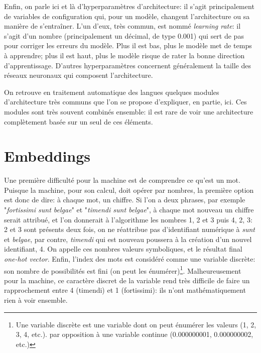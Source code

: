 Enfin, on parle ici et là d'hyperparamètres d'architecture: il s'agit principalement de variables de configuration qui, pour un modèle, changent l'architecture ou sa manière de s'entraîner. L'un d'eux, très commun, est nommé \textit{learning rate}: il s'agit d'un nombre (principalement un décimal, de type 0.001) qui sert de pas pour corriger les erreurs du modèle. Plus il est bas, plus le modèle met de temps à apprendre; plus il est haut, plus le modèle risque de rater la bonne direction d'apprentissage. D'autres hyperparamètres concernent généralement la taille des réseaux neuronaux qui composent l'architecture. 

On retrouve en traitement automatique des langues quelques modules d'architecture très communs que l'on se propose d'expliquer, en partie, ici. Ces modules sont très souvent combinés ensemble: il est rare de voir une architecture complètement basée sur un seul de ces éléments.

\section{Embeddings}
\label{deep-learning:embeddings}

Une première difficulté pour la machine est de comprendre ce qu'est un mot. Puisque la machine, pour son calcul, doit opérer par nombres, la première option est donc de dire: à chaque mot, un chiffre. Si l'on a deux phrases, par exemple "\textit{fortissimi sunt belgae}" et "\textit{timendi sunt belgae}", à chaque mot nouveau un chiffre serait attribué, et l'on donnerait à l'algorithme les nombres 1, 2 et 3 puis 4, 2, 3: 2 et 3 sont présents deux fois, on ne réattribue pas d'identifiant numérique à \textit{sunt} et \textit{belgae}, par contre, \textit{timendi} qui est nouveau poussera à la création d'un nouvel identifiant, 4. On appelle ces nombres valeurs symboliques, et le résultat final \textit{one-hot vector}. Enfin, l'index des mots est considéré comme une variable discrète: son nombre de possibilités est fini (on peut les énumérer)\footnote{Une variable discrète est une variable dont on peut énumérer les valeurs (1, 2, 3, 4, etc.). par opposition à une variable continue (0.000000001, 0.000000002, etc.)}. Malheureusement pour la machine, ce caractère discret de la variable rend très difficile de faire un rapprochement entre 4 (timendi) et 1 (fortissimi): ils n'ont mathématiquement rien à voir ensemble. 

